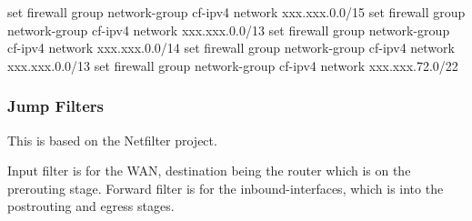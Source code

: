 \documentclass[
]{article}
\newenvironment{Shaded}{\begin{snugshade}}{\end{snugshade}}
\newcommand{\BuiltInTok}[1]{#1}
\newcommand{\NormalTok}[1]{#1}
\newcommand{\StringTok}[1]{\textcolor[rgb]{0.31,0.60,0.02}{#1}}
\begin{document}
\begin{Shaded}
\begin{Highlighting}[numbers=left,,]
\BuiltInTok{set}\NormalTok{ firewall group network{-}group cf{-}ipv4 network }\StringTok{\textquotesingle{}xxx.xxx.0.0/15\textquotesingle{}}
\BuiltInTok{set}\NormalTok{ firewall group network{-}group cf{-}ipv4 network }\StringTok{\textquotesingle{}xxx.xxx.0.0/13\textquotesingle{}}
\BuiltInTok{set}\NormalTok{ firewall group network{-}group cf{-}ipv4 network }\StringTok{\textquotesingle{}xxx.xxx.0.0/14\textquotesingle{}}
\BuiltInTok{set}\NormalTok{ firewall group network{-}group cf{-}ipv4 network }\StringTok{\textquotesingle{}xxx.xxx.0.0/13\textquotesingle{}}
\BuiltInTok{set}\NormalTok{ firewall group network{-}group cf{-}ipv4 network }\StringTok{\textquotesingle{}xxx.xxx.72.0/22\textquotesingle{}}
\end{Highlighting}
\end{Shaded}

\newpage{}

\subsubsection{Jump Filters}\label{jump-filters}

This is based on the Netfilter project.

Input filter is for the WAN, destination being the router which is on
the prerouting stage. Forward filter is for the inbound-interfaces,
which is into the postrouting and egress stages.
\end{document}
